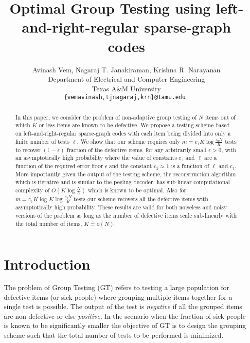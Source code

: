 \documentclass[conference,,twocolumn]{IEEEtran}
\begin{document}
\title{Optimal Group Testing using left-and-right-regular sparse-graph codes}
\author{Avinash Vem, Nagaraj T. Janakiraman, Krishna R. Narayanan\\
Department of Electrical and Computer Engineering \\
Texas A\&M University\\
{\tt\small {\{vemavinash,tjnagaraj,krn\}@tamu.edu} }}

\maketitle
\begin{abstract} 
In this paper, we consider the problem of non-adaptive group testing of $N$ items out of which $K$ or less items are known to be defective. We propose a testing scheme based on left-and-right-regular sparse-graph codes with each item being divided into only a finite number of tests $\ell$. We show that our scheme requires only $m=c_1 K\log \frac{c_2N}{K}$ tests to recover $(1-\epsilon)$ fraction of the defective items, for any arbitrarily small $\epsilon>0$, with an asymptotically high probability where the value of constants $c_1$ and $\ell$ are a function of the required error floor $\epsilon$  and the constant $c_2 \approx 1$ is a function of $\ell$ and $c_1$. More importantly given the output of the testing scheme, the reconstruction algorithm which is iterative and is similar to the peeling decoder, has sub-linear computational complexity of $O(K\log \frac{N}{K})$ which is known to be optimal. Also for $m=c_1 K\log K\log \frac{c_2N}{K}$ tests our scheme recovers all the defective items with asymptotically high probability. These results are valid for both noiseless and noisy versions of the problem as long as the number of defective items scale sub-linearly with the total number of items, $K= o(N)$.
\end{abstract}

\section{Introduction}
The problem of Group Testing (GT) refers to testing a large population for defective items (or sick people) where grouping multiple items together for a single test is possible. The output of the test is \textit{negative} if all the grouped items are non-defective or else \textit{positive.} In the scenario when the fraction of sick people is known to be significantly smaller the objective of GT is to design the grouping scheme such that the total number of tests to be performed is minimized. 
\end{document}
